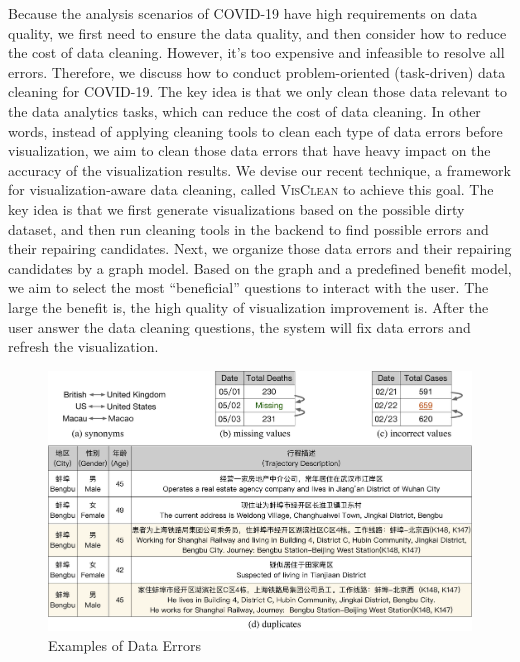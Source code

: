 Because the analysis scenarios of COVID-19 have high requirements on data quality, we first need to ensure the data quality, and then consider how to reduce the cost of data cleaning.
However, it's too expensive and infeasible to resolve all errors.
Therefore, we discuss how to conduct problem-oriented (task-driven) data cleaning for COVID-19. 
The key idea is that we only clean those data relevant to the data analytics tasks, which can reduce the cost of data cleaning.
In other words, instead of applying cleaning tools to clean each type of data errors before visualization, we aim to clean those data errors that have heavy impact on the accuracy of the visualization results.
We devise our recent technique, a framework for visualization-aware data cleaning, called \textsc{VisClean} to achieve this goal.
The key idea is that we first generate visualizations based on the possible dirty dataset, and then run cleaning tools in the backend to find possible errors and their repairing candidates. Next, we organize those data errors and their repairing candidates by a graph model. Based on the graph and a predefined benefit model, we aim to select the most ``beneficial'' questions to interact with the user. The large the benefit is, the high quality of visualization improvement is. After the user answer the data cleaning questions, the system will fix data errors and refresh the visualization.
%

\begin{figure}[t!]
	\centering
	\includegraphics[width=.85\columnwidth]{figs/data_errors.pdf}
	\vspace{-1em}
	\caption{Examples of Data Errors}
	\label{fig:data_errors}
	\vspace{-1em}
\end{figure}

